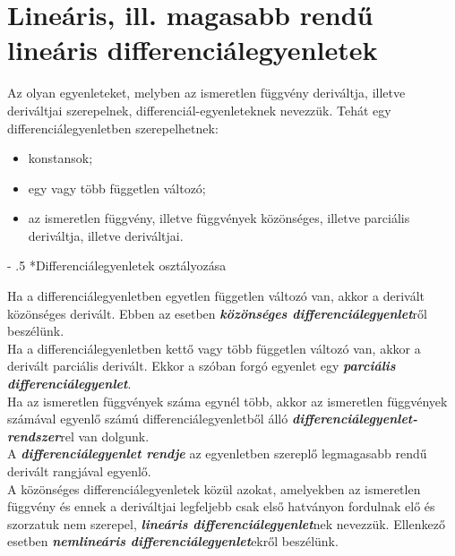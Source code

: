 \documentclass[12pt,margin=0px]{article}
\makeatletter
\renewcommand\paragraph{%
	\@startsection{paragraph}{4}{0mm}%
	{-\baselineskip}%
	{.5\baselineskip}%
	{\normalfont\normalsize\bfseries}}
\makeatother
\begin{document}
    \section*{Lineáris, ill. magasabb rendű lineáris differenciálegyenletek}

    \noindent Az olyan egyenleteket, melyben az ismeretlen függvény deriváltja, illetve deriváltjai szerepelnek, differenciál-egyenleteknek nevezzük. Tehát egy differenciálegyenletben szerepelhetnek:
    \begin{itemize}
        \item konstansok;
        \item egy vagy több független változó;
        \item az ismeretlen függvény, illetve függvények közönséges, illetve parciális deriváltja, illetve deriváltjai.
    \end{itemize}

    \paragraph*{Differenciálegyenletek osztályozása}

    \noindent Ha a differenciálegyenletben egyetlen független változó van, akkor a derivált közönséges derivált. Ebben az esetben \textbf{\emph{közönséges differenciálegyenlet}}ről beszélünk.\\

    \noindent Ha a differenciálegyenletben kettő vagy több független változó van, akkor a derivált parciális derivált. Ekkor a szóban forgó egyenlet egy \textbf{\emph{parciális differenciálegyenlet}}.\\

    \noindent Ha az ismeretlen függvények száma egynél több, akkor az ismeretlen függvények számával egyenlő számú differenciálegyenletből álló \textbf{\emph{differenciálegyenlet-rendszer}}rel van dolgunk.\\

    \noindent A \textbf{\emph{differenciálegyenlet rendje}} az egyenletben szereplő legmagasabb rendű derivált rangjával egyenlő.\\

    \noindent A közönséges differenciálegyenletek közül azokat, amelyekben az ismeretlen függvény és ennek a deriváltjai legfeljebb csak első hatványon fordulnak elő és szorzatuk nem szerepel, \textbf{\emph{lineáris differenciálegyenlet}}nek nevezzük. Ellenkező esetben \textbf{\emph{nemlineáris differenciálegyenlet}}ekről beszélünk.\\
\end{document}
